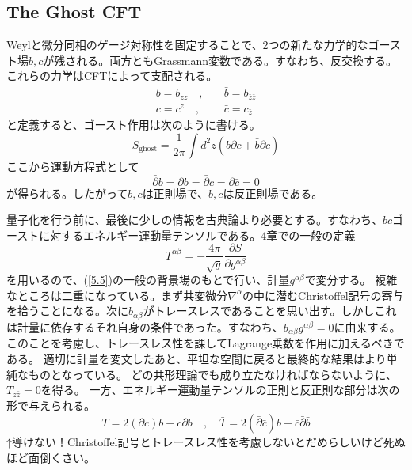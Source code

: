 \documentclass[10pt]{jsarticle}
\newcommand{\kakko}[1]{\left(#1 \right)} %
\newcommand{\henbi}[2]{{\frac{\partial#1}{\partial#2}}} %
\newcommand{\del}{{\partial}} %
\begin{document}
\subsection{The Ghost CFT}
Weylと微分同相のゲージ対称性を固定することで、2つの新たな力学的なゴースト場$b,c$が残される。両方ともGrassmann変数である。すなわち、反交換する。
これらの力学はCFTによって支配される。
\begin{align}
  b=b_{zz}\quad ,& \quad \bar{b}=b_{\bar{z}\bar{z}}\\
  c=c^{z}\quad ,& \quad \bar{c}=c_{\bar{z}}
\end{align}
と定義すると、ゴースト作用は次のように書ける。
\begin{equation}
  S_{\mathrm{ghost}}=\frac{1}{2\pi}\int d^{2}z \kakko{b\bar{\del}c+\bar{b}\del\bar{c}}
\end{equation}
ここから運動方程式として
\begin{equation}
  \bar{\del}b=\del\bar{b}=\bar{\del}c=\del\bar{c}=0
\end{equation}
が得られる。したがって$b,c$は正則場で、$\bar{b},\bar{c}$は反正則場である。

量子化を行う前に、最後に少しの情報を古典論より必要とする。すなわち、$bc$ゴーストに対するエネルギー運動量テンソルである。4章での一般の定義
\begin{equation}
  T^{\alpha\beta}=-\frac{4\pi}{\sqrt{g}}\henbi{S}{g^{\alpha\beta}}
\end{equation}
を用いるので、(\ref{5.5})の一般の背景場のもとで行い、計量$g^{\alpha\beta}$で変分する。
複雑なところは二重になっている。まず共変微分$\nabla^{\alpha}$の中に潜むChristoffel記号の寄与を拾うことになる。次に$b_{\alpha\beta}$がトレースレスであることを思い出す。しかしこれは計量に依存するそれ自身の条件であった。すなわち、$b_{\alpha\beta}g^{\alpha\beta}=0$に由来する。
このことを考慮し、トレースレス性を課してLagrange乗数を作用に加えるべきである。
適切に計量を変文したあと、平坦な空間に戻ると最終的な結果はより単純なものとなっている。
どの共形理論でも成り立たなければならないように、$T_{z\bar{z}}=0$を得る。
一方、エネルギー運動量テンソルの正則と反正則な部分は次の形で与えられる。
\begin{equation}
  T=2(\del c)b+c \del b\quad , \quad \bar{T}=2(\bar{\del} \bar{c})b+\bar{c} \bar{\del} \bar{b}
\end{equation}
↑導けない！Christoffel記号とトレースレス性を考慮しないとだめらしいけど死ぬほど面倒くさい。
\end{document}
